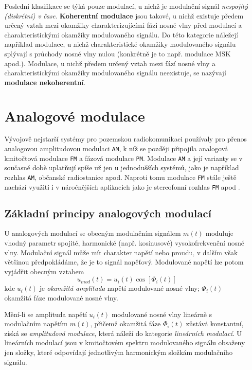       Poslední klasifikace se týká pouze modulací, u nichž je modulační signál \emph{nespojitý 
      (diskrétní) v čase}. \textbf{Koherentní modulace} jsou takové, u nichž existuje předem určený 
      vztah mezi okamžiky charakterizujícími fázi nosné vlny před modulací a charakteristickými 
      okamžiky modulovaného signálu. Do této kategorie náležejí například modulace, u nichž 
      charakteristické okamžiky modulovaného signálu splývají s průchody nosné vlny nulou 
      (konkrétně je to např. modulace MSK apod.). Modulace, u nichž předem určený vztah mezi fází 
      nosné vlny a charakteristickými okamžiky modulovaného signálu neexistuje, se nazývají 
      \textbf{modulace nekoherentní}.
      
  \section{Analogové modulace}
    Vývojově nejstarší systémy pro pozemskou radiokomunikaci používaly pro přenos analogovou 
    amplitudovou modulaci \texttt{AM}, k níž se později připojila analogová kmitočtová modulace 
    \texttt{FM} a fázová modulace \texttt{PM}. Modulace \texttt{AM} a její varianty se v současné 
    době uplatňují spíše už jen u jednodušších systémů, jako je například rozhlas \texttt{AM}, 
    občanské radiostanice apod. Naproti tomu modulace \texttt{FM} stále ještě nachází využití i v 
    náročnějších aplikacích jako je stereofonní rozhlas \texttt{FM} apod \cite[s.~75]{ZaludRA}.
    
    \subsection{Základní principy analogových modulací}
      U analogových modulací se obecným modulačním signálem \(m(t)\) moduluje vhodný parametr 
      spojité, harmonické (např. kosinusové) vysokofrekvenční nosné vlny. Modulační signál může mít 
      charakter napětí nebo proudu, v dalším však většinou předpokládáme, že je to signál napěťový. 
      Modulované napětí lze potom vyjádřit obecným vztahem
      \begin{equation}\label{eq:RA_mdlc_01}
        u_{mod}(t) = u_i(t)\cos[\Phi_i(t)]
      \end{equation}
      kde \(u_i (t)\) je \emph{okamžitá amplituda} napětí modulované nosné vlny; \(\Phi_i(t)\) 
      okamžitá fáze modulované nosné vlny.
      
      Mění-li se amplituda napětí \(u_i(t)\) modulované nosné vlny lineárně s modulačním napětím 
      \(m(t)\), přičemž okamžitá fáze \(\Phi_i(t)\) zůstává konstantní, získá se \emph{amplitudová 
      modulace}, která náleží do kategorie \emph{lineárních modulací}. U lineárních modulací jsou v 
      kmitočtovém spektru modulovaného signálu obsaženy jen složky, které odpovídají jednotlivým 
      harmonickým složkám modulačního signálu.
      
